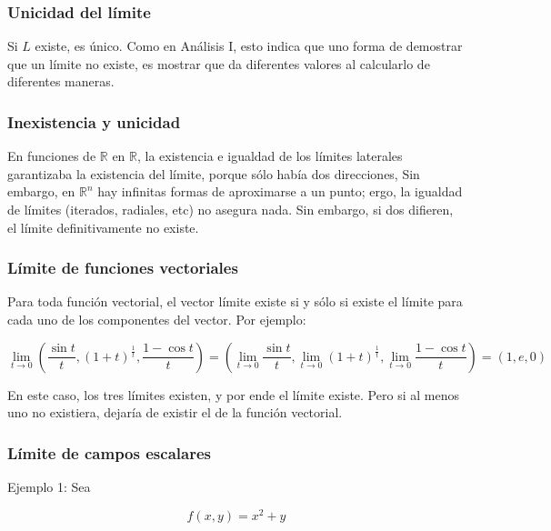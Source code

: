 \documentclass{article}
\renewcommand{\Bbb}{\mathbb}
\begin{document}
\subsubsection{Unicidad del límite}

Si $L$ existe, es único. Como en Análisis I, esto indica que uno forma de demostrar que un límite no existe, es mostrar que da diferentes valores al calcularlo de diferentes maneras.

\subsubsection{Inexistencia y unicidad}

En funciones de $\Bbb R$ en $\Bbb R$, la existencia e igualdad de los límites laterales garantizaba la existencia del límite, porque sólo había dos direcciones, Sin embargo, en $\Bbb R^n$ hay infinitas formas de aproximarse a un punto; ergo, la igualdad de límites (iterados, radiales, etc) no asegura nada. Sin embargo, si dos difieren, el límite definitivamente no existe.

\subsubsection{Límite de funciones vectoriales}

Para toda función vectorial, el vector límite existe si y sólo si existe el límite para cada uno de los componentes del vector. Por ejemplo:

\begin{equation}
\lim_{t \rightarrow 0} \left( \frac{\sin t}{t}, (1 + t)^\frac{1}{t}, \frac{1-\cos t}{t} \right) = \left( \lim_{t \rightarrow 0} \frac{\sin t}{t}, \lim_{t \rightarrow 0} (1 + t)^\frac{1}{t}, \lim_{t \rightarrow 0} \frac{1-\cos t}{t} \right) = (1, e, 0)
\end{equation}

En este caso, los tres límites existen, y por ende el límite existe. Pero si al menos uno no existiera, dejaría de existir el de la función vectorial.

\subsubsection{Límite de campos escalares}

Ejemplo 1: Sea

\begin{equation}
f(x,y) = x^2 + y
\end{equation}
\end{document}
